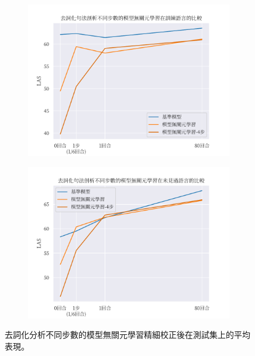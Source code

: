 \begin{figure}[htbp]
    \centering
    \begin{subfigure}[t]{\textwidth}
        \centering
        \includegraphics[width=\textwidth]{figs/chapter3/delex/delex_maml_train_langs.pdf}
    \end{subfigure}
    \vspace{-12pt}
    \begin{subfigure}[t]{\textwidth}
        \centering
        \includegraphics[width=\textwidth]{figs/chapter3/delex/delex_maml_test_langs.pdf}
    \end{subfigure}
    \caption{去詞化分析不同步數的模型無關元學習精細校正後在測試集上的平均表現。}
    \label{fig:delex_avg}
\end{figure}